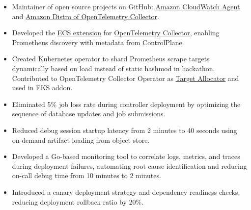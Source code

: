 \documentclass[11pt, letterpaper]{simple-cv}
\begin{document}
\begin{itemize}
	\item Maintainer of open source projects on GitHub: \href{https://github.com/aws/amazon-cloudwatch-agent}{Amazon CloudWatch Agent} and \href{https://github.com/aws-observability/aws-otel-collector}{Amazon Distro of OpenTelemetry Collector}.
	\item Developed the \href{https://github.com/open-telemetry/opentelemetry-collector-contrib/tree/main/extension/observer/ecsobserver}{ECS extension} for \href{https://github.com/open-telemetry/opentelemetry-collector-contrib}{OpenTelemetry Collector},
	enabling Prometheus discovery with metadata from ControlPlane.
	\item Created Kubernetes operator to shard Prometheus scrape targets dynamically based on load instead of static hashmod in hackathon.
	Contributed to OpenTelemetry Collector Operator as \href{https://github.com/open-telemetry/opentelemetry-operator/tree/main/cmd/otel-allocator}{Target Allocator} and used in EKS addon.
\end{itemize}

\begin{itemize}
	\item Eliminated 5\% job loss rate during controller deployment by optimizing the sequence of database updates and job submissions.
	\item Reduced debug session startup latency from 2 minutes to 40 seconds using on-demand artifact loading from object store.
\end{itemize}

\begin{itemize}
	\item Developed a Go-based monitoring tool to correlate logs, metrics, and traces during deployment failures, automating root cause identification and reducing on-call debug time from 10 minutes to 2 minutes.
	\item Introduced a canary deployment strategy and dependency readiness checks, reducing deployment rollback ratio by 20\%.
\end{itemize}
\end{document}
